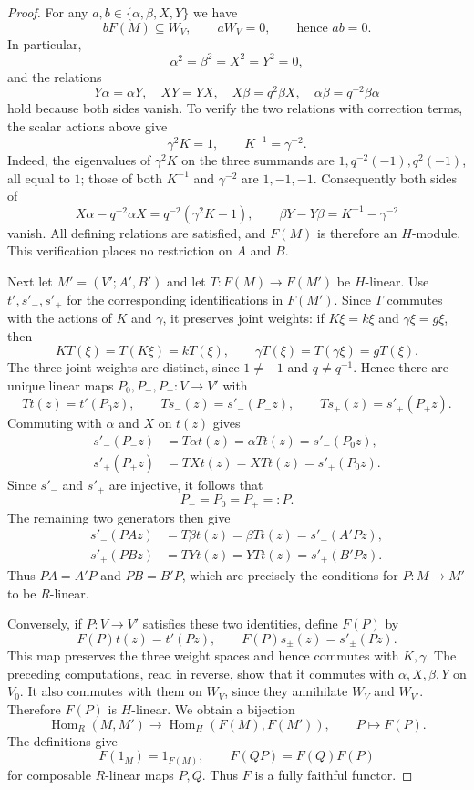 \documentclass[10pt,oneside]{amsart}
\theoremstyle{definition}
\begin{document}
\begin{proof}
For any $a,b\in\{\alpha,\beta,X,Y\}$ we have
\[
 bF(M)\subseteq W_V,\qquad aW_V=0,
 \qquad\text{hence }ab=0.
\]
In particular,
\[
 \alpha^2=\beta^2=X^2=Y^2=0,
\]
and the relations
\[
 Y\alpha=\alpha Y,\quad XY=YX,\quad
 X\beta=q^2\beta X,\quad \alpha\beta=q^{-2}\beta\alpha
\]
hold because both sides vanish. To verify the two relations with
correction terms, the scalar actions above give
\[
 \gamma^2K=1,\qquad K^{-1}=\gamma^{-2}.
\]
Indeed, the eigenvalues of $\gamma^2K$ on the three summands are
$1,q^{-2}(-1),q^2(-1)$, all equal to $1$; those of both
$K^{-1}$ and $\gamma^{-2}$ are $1,-1,-1$.
Consequently both sides of
\[
 X\alpha-q^{-2}\alpha X=q^{-2}(\gamma^2K-1),
 \qquad
 \beta Y-Y\beta=K^{-1}-\gamma^{-2}
\]
vanish. All defining relations are satisfied, and $F(M)$ is
therefore an $H$-module. This verification places no restriction
on $A$ and $B$.

Next let $M'=(V';A',B')$ and let $T:F(M)\to F(M')$ be
$H$-linear. Use $t',s'_-,s'_+$ for the corresponding identifications
in $F(M')$. Since $T$ commutes with the actions of $K$ and $\gamma$,
it preserves joint weights: if $K\xi=k\xi$ and $\gamma\xi=g\xi$,
then
\[
 K T(\xi)=T(K\xi)=kT(\xi),\qquad
 \gamma T(\xi)=T(\gamma\xi)=gT(\xi).
\]
The three joint weights are distinct, since $1\ne-1$ and
$q\ne q^{-1}$. Hence there are unique linear maps
$P_0,P_-,P_+:V\to V'$ with
\[
 Tt(z)=t'(P_0z),\qquad
 Ts_-(z)=s'_-(P_-z),\qquad
 Ts_+(z)=s'_+(P_+z).
\]
Commuting with $\alpha$ and $X$ on $t(z)$ gives
\begin{align*}
 s'_-(P_-z)&=T\alpha t(z)=\alpha Tt(z)=s'_-(P_0z),\\
 s'_+(P_+z)&=TXt(z)=XTt(z)=s'_+(P_0z).
\end{align*}
Since $s'_-$ and $s'_+$ are injective, it follows that
\[
 P_-=P_0=P_+=:P.
\]
The remaining two generators then give
\begin{align*}
 s'_-(PAz)&=T\beta t(z)=\beta Tt(z)=s'_-(A'Pz),\\
 s'_+(PBz)&=TYt(z)=YTt(z)=s'_+(B'Pz).
\end{align*}
Thus $PA=A'P$ and $PB=B'P$, which are precisely the conditions for
$P:M\to M'$ to be $R$-linear.

Conversely, if $P:V\to V'$ satisfies these two identities, define
$F(P)$ by
\[
 F(P)t(z)=t'(Pz),\qquad
 F(P)s_\pm(z)=s'_\pm(Pz).
\]
This map preserves the three weight spaces and hence commutes with
$K,\gamma$. The preceding computations, read in reverse, show that
it commutes with $\alpha,X,\beta,Y$ on $V_0$. It also commutes
with them on $W_V$, since they annihilate $W_V$ and $W_{V'}$.
Therefore $F(P)$ is $H$-linear. We obtain a bijection
\[
 \operatorname{Hom}_R(M,M')
 \longrightarrow\operatorname{Hom}_H(F(M),F(M')),
 \qquad P\longmapsto F(P).
\]
The definitions give
\[
 F(1_M)=1_{F(M)},\qquad F(QP)=F(Q)F(P)
\]
for composable $R$-linear maps $P,Q$. Thus $F$ is a fully faithful
functor.


\end{proof}
\end{document}

